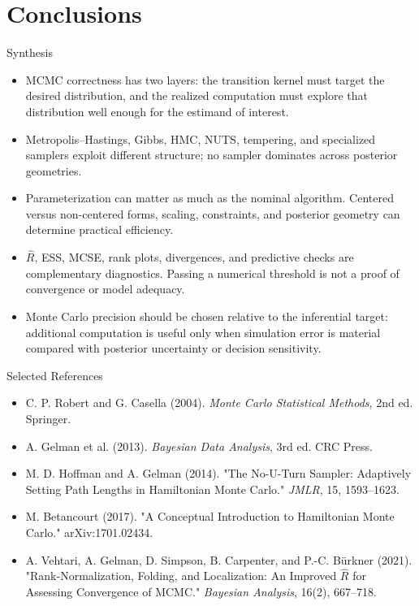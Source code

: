 \documentclass[aspectratio=169,11pt]{beamer}
\begin{document}
\section{Conclusions}

\begin{frame}{Synthesis}
  \begin{itemize}
    \item MCMC correctness has two layers: the transition kernel must target the desired distribution, and the realized computation must explore that distribution well enough for the estimand of interest.
    \item Metropolis--Hastings, Gibbs, HMC, NUTS, tempering, and specialized samplers exploit different structure; no sampler dominates across posterior geometries.
    \item Parameterization can matter as much as the nominal algorithm. Centered versus non-centered forms, scaling, constraints, and posterior geometry can determine practical efficiency.
    \item $\hat R$, ESS, MCSE, rank plots, divergences, and predictive checks are complementary diagnostics. Passing a numerical threshold is not a proof of convergence or model adequacy.
    \item Monte Carlo precision should be chosen relative to the inferential target: additional computation is useful only when simulation error is material compared with posterior uncertainty or decision sensitivity.
  \end{itemize}
\end{frame}

\begin{frame}{Selected References}
  \small
  \begin{itemize}
    \item C. P. Robert and G. Casella (2004). \textit{Monte Carlo Statistical Methods}, 2nd ed. Springer.
    \item A. Gelman et al. (2013). \textit{Bayesian Data Analysis}, 3rd ed. CRC Press.
    \item M. D. Hoffman and A. Gelman (2014). "The No-U-Turn Sampler: Adaptively Setting Path Lengths in Hamiltonian Monte Carlo." \textit{JMLR}, 15, 1593--1623.
    \item M. Betancourt (2017). "A Conceptual Introduction to Hamiltonian Monte Carlo." arXiv:1701.02434.
    \item A. Vehtari, A. Gelman, D. Simpson, B. Carpenter, and P.-C. Bürkner (2021). "Rank-Normalization, Folding, and Localization: An Improved $\hat R$ for Assessing Convergence of MCMC." \textit{Bayesian Analysis}, 16(2), 667--718.
  \end{itemize}
\end{frame}

\contactslide
\end{document}
